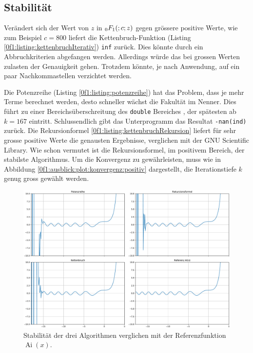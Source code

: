 \subsection{Stabilität
\label{0f1:subsection:Stabilitaet}}
Verändert sich der Wert von $z$ in $\mathstrut_0F_1(;c;z)$ gegen grössere positive Werte, wie zum Beispiel $c = 800$ liefert die Kettenbruch-Funktion (Listing \ref{0f1:listing:kettenbruchIterativ}) \verb+inf+ zurück. Dies könnte durch ein Abbruchkriterien abgefangen werden. Allerdings würde das bei grossen Werten zulasten der Genauigkeit gehen. Trotzdem könnte, je nach Anwendung, auf ein paar Nachkommastellen verzichtet werden.

Die Potenzreihe (Listing \ref{0f1:listing:potenzreihe}) hat das Problem,
dass je mehr Terme berechnet werden, desto schneller wächst die Fakultät im Nenner. Dies führt zu einer Bereichsüberschreitung des \verb+double+ Bereiches \cite{0f1:double}, der spätesten ab $k=167$ eintritt. Schlussendlich gibt das Unterprogramm das Resultat \verb+-nan(ind)+ zurück.
Die Rekursionformel \eqref{0f1:listing:kettenbruchRekursion} liefert für sehr grosse positive Werte die genausten Ergebnisse, verglichen mit der GNU Scientific Library. Wie schon vermutet ist die Rekursionsformel, im positivem Bereich, der stabilste Algorithmus. Um die Konvergenz zu gewährleisten, muss wie in Abbildung \ref{0f1:ausblick:plot:konvergenz:positiv} dargestellt, die Iterationstiefe $k$ genug gross gewählt werden.

\begin{figure}
    \centering
    \includegraphics[width=1\textwidth]{papers/0f1/images/stabilitaet.pdf}
    \caption{Stabilität der drei Algorithmen verglichen mit der Referenzfunktion $\operatorname{Ai}(x)$.
    \label{0f1:ausblick:plot:airy:stabilitaet}}
\end{figure}

